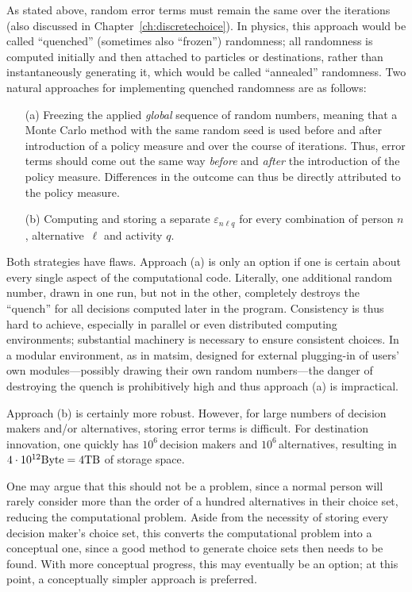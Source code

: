 As stated above, random error terms must remain the same over the iterations (also discussed in Chapter~\ref{ch:discretechoice}). 
In physics, this approach would be called ``quenched'' (sometimes also ``frozen'') randomness; all randomness is computed initially and then attached to particles or destinations, rather than instantaneously generating it, which would be called ``annealed'' randomness. 
Two natural approaches for implementing quenched randomness are as follows:
%
\begin{itemize}\styleItemize
\item[(a)] Freezing the applied \emph{global} sequence of random numbers, meaning that a Monte Carlo method with the same random seed is used before and after  introduction of a policy measure and over the course of iterations. Thus, error terms should come out the same way \emph{before} and \emph{after} the introduction of the policy measure. Differences in the outcome can thus be directly attributed to the policy measure. 
\item[(b)] Computing and storing a separate $\varepsilon_{n\ell q}$ for every combination of person $n$, alternative~$\ell$ and activity $q$.
\end{itemize}
 
Both strategies have flaws. 
Approach (a) is only an option if one is certain about every single aspect of the computational code. 
Literally, one additional random number, drawn in one run, but not in the other, completely destroys the ``quench'' for all decisions computed later in the program. Consistency is thus hard to achieve, especially in parallel or even distributed computing environments; substantial machinery is necessary to ensure consistent choices. 
In a modular environment, as in \gls{matsim}, designed for external plugging-in of users' own modules---possibly drawing their own random numbers---the danger of destroying the quench is prohibitively high and thus approach (a) is impractical.

Approach (b) is certainly more robust. 
However, for large numbers of decision makers and/or alternatives, storing error terms is difficult. 
For destination innovation, one quickly has $10^6$\,decision makers and $10^6$\,alternatives, resulting in $4 \cdot 10^{12} \hbox{Byte} = 4 \hbox{TB}$ of storage space.

One may argue that this should not be a problem, since a normal person will rarely consider more than the order of a hundred alternatives in their choice set, reducing the computational problem. Aside from the necessity of storing every decision maker's choice set, this converts the computational problem into a conceptual one, since a good method to generate choice sets then needs to be found. 
With more conceptual progress, this may eventually be an option; at this point, a conceptually simpler approach is preferred.

